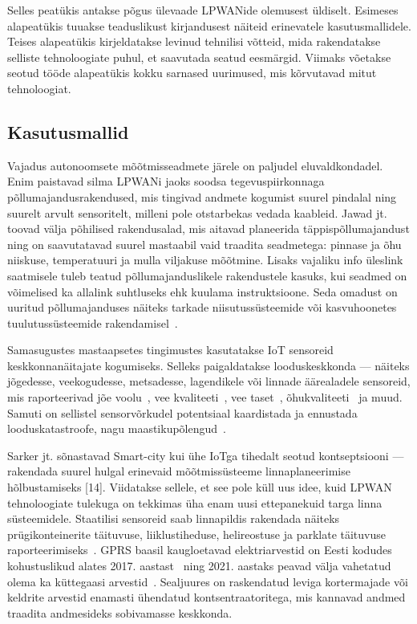 \documentclass[12pt]{article}
\begin{document}
Selles peatükis antakse põgus ülevaade LPWANide olemusest üldiselt.
Esimeses alapeatükis tuuakse teaduslikust kirjandusest näiteid erinevatele kasutusmallidele.
Teises alapeatükis kirjeldatakse levinud tehnilisi võtteid, mida rakendatakse selliste tehnoloogiate puhul, et saavutada seatud eesmärgid.
Viimaks võetakse seotud tööde alapeatükis kokku sarnased uurimused, mis kõrvutavad mitut tehnoloogiat.

\subsection{Kasutusmallid}

Vajadus autonoomsete mõõtmisseadmete järele on paljudel eluvaldkondadel. Enim paistavad silma LPWANi jaoks soodsa tegevuspiirkonnaga põllumajandusrakendused, mis tingivad andmete kogumist suurel pindalal ning suurelt arvult sensoritelt, milleni pole otstarbekas vedada kaableid.
Jawad jt.~\cite{jawad2017energy} toovad välja põhilised rakendusalad, mis aitavad planeerida täppispõllumajandust ning on saavutatavad suurel mastaabil vaid traadita seadmetega: pinnase ja õhu niiskuse, temperatuuri ja mulla viljakuse mõõtmine.
Lisaks vajaliku info üleslink saatmisele tuleb teatud põllumajanduslikele rakendustele kasuks, kui seadmed on võimelised ka allalink suhtluseks ehk kuulama instruktsioone.
Seda omadust on uuritud põllumajanduses näiteks tarkade niisutussüsteemide või kasvuhoonetes tuulutussüsteemide rakendamisel~\cite{abba2019design}.

Samasugustes mastaapsetes tingimustes kasutatakse IoT sensoreid keskkonnanäitajate kogumiseks.
Selleks paigaldatakse looduskeskkonda — näiteks jõgedesse, veekogudesse, metsadesse, lagendikele või linnade äärealadele sensoreid, mis raporteerivad jõe voolu~\cite{guibene2017evaluation}, vee kvaliteeti~\cite{liu2018solar}, vee taset~\cite{moreno2019rivercore}, õhukvaliteeti~\cite{knoll2018low} ja muud.
Samuti on sellistel sensorvõrkudel potentsiaal kaardistada ja ennustada looduskatastroofe, nagu  maastikupõlengud~\cite{kang}.

Sarker jt. sõnastavad Smart-city kui ühe IoTga tihedalt seotud kontseptsiooni — rakendada suurel hulgal erinevaid mõõtmissüsteeme linnaplaneerimise hõlbustamiseks [14].
Viidatakse sellele, et see pole küll uus idee, kuid LPWAN tehnoloogiate tulekuga on tekkimas üha enam uusi ettepanekuid targa linna süsteemidele.
Staatilisi sensoreid saab linnapildis rakendada näiteks prügikonteinerite täituvuse, liiklustiheduse, helireostuse ja parklate täituvuse raporteerimiseks~\cite{zanella}.
GPRS baasil kaugloetavad elektriarvestid on Eesti kodudes kohustuslikud alates 2017. aastast~\cite{laurit} ning 2021. aastaks peavad välja vahetatud olema ka küttegaasi arvestid~\cite{gaas}.
Sealjuures on raskendatud leviga kortermajade või keldrite arvestid enamasti ühendatud kontsentraatoritega, mis kannavad andmed traadita andmesideks sobivamasse keskkonda.
\end{document}
